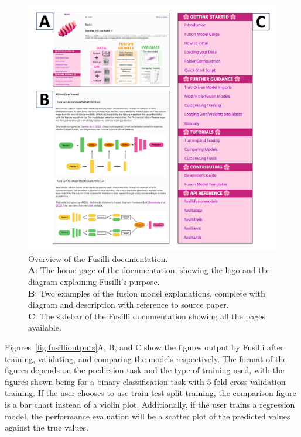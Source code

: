\begin{figure}
    \centering
    \includegraphics[width=1\linewidth]{figures/fusilli_documentation}
    \caption{Overview of the Fusilli documentation. \\
    \textbf{A}: The home page of the documentation, showing the logo and the diagram explaining Fusilli's purpose.\\
    \textbf{B}: Two examples of the fusion model explanations, complete with diagram and description with reference to source paper. \\
    \textbf{C}: The sidebar of the Fusilli documentation showing all the pages available.
    }
    \label{fig:fusillidocs}
\end{figure}

Figures~\ref{fig:fusillioutputs}A, B, and C show the figures output by Fusilli after training, validating, and comparing the models respectively.
The format of the figures depends on the prediction task and the type of training used, with the figures shown being for a binary classification task with 5-fold cross validation training.
If the user chooses to use train-test split training, the comparison figure is a bar chart instead of a violin plot.
Additionally, if the user trains a regression model, the performance evaluation will be a scatter plot of the predicted values against the true values.


